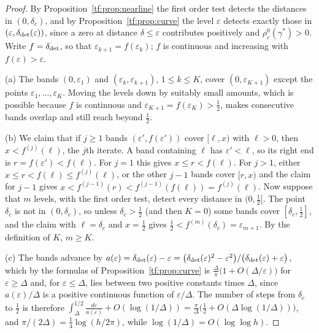\begin{proof}
By Proposition~\ref{tf:prop:nearline} the first order test detects the distances in $(0,\delta_c)$, and by Proposition~\ref{tf:prop:curve} the level $\varepsilon$ detects exactly those in $(\varepsilon,\delta_{\rm det}(\varepsilon))$, since a zero at distance $\delta\le\varepsilon$ contributes positively and $\rho^0_\varepsilon(\gamma^*)>0$. Write $f=\delta_{\rm det}$, so that $\varepsilon_{k+1}=f(\varepsilon_k)$; $f$ is continuous and increasing with $f(\varepsilon)>\varepsilon$.

(a) The bands $(0,\varepsilon_1)$ and $(\varepsilon_k,\varepsilon_{k+1})$, $1\le k\le K$, cover $(0,\varepsilon_{K+1})$ except the points $\varepsilon_1,\dots,\varepsilon_K$. Moving the levels down by suitably small amounts, which is possible because $f$ is continuous and $\varepsilon_{K+1}=f(\varepsilon_K)>\tfrac12$, makes consecutive bands overlap and still reach beyond $\tfrac12$.

(b) We claim that if $j\ge1$ bands $(\varepsilon',f(\varepsilon'))$ cover $[\ell,x)$ with $\ell>0$, then $x<f^{(j)}(\ell)$, the $j$th iterate. A band containing $\ell$ has $\varepsilon'<\ell$, so its right end is $r=f(\varepsilon')<f(\ell)$. For $j=1$ this gives $x\le r<f(\ell)$. For $j>1$, either $x\le r<f(\ell)\le f^{(j)}(\ell)$, or the other $j-1$ bands cover $[r,x)$ and the claim for $j-1$ gives $x<f^{(j-1)}(r)<f^{(j-1)}(f(\ell))=f^{(j)}(\ell)$. Now suppose that $m$ levels, with the first order test, detect every distance in $(0,\tfrac12]$. The point $\delta_c$ is not in $(0,\delta_c)$, so unless $\delta_c>\tfrac12$ (and then $K=0$) some bands cover $[\delta_c,\tfrac12]$, and the claim with $\ell=\delta_c$ and $x=\tfrac12$ gives $\tfrac12<f^{(m)}(\delta_c)=\varepsilon_{m+1}$. By the definition of $K$, $m\ge K$.

(c) The bands advance by $a(\varepsilon)=\delta_{\rm det}(\varepsilon)-\varepsilon=\big(\delta_{\rm det}(\varepsilon)^2-\varepsilon^2\big)/\big(\delta_{\rm det}(\varepsilon)+\varepsilon\big)$, which by the formulas of Proposition~\ref{tf:prop:curve} is $\frac\Delta\pi\big(1+O(\Delta/\varepsilon)\big)$ for $\varepsilon\ge\Delta$ and, for $\varepsilon\le\Delta$, lies between two positive constants times $\Delta$, since $a(\varepsilon)/\Delta$ is a positive continuous function of $\varepsilon/\Delta$. The number of steps from $\delta_c$ to $\tfrac12$ is therefore $\int_{\Delta}^{1/2}\frac{d\varepsilon}{a(\varepsilon)}+O(\log(1/\Delta))=\frac\pi\Delta\big(\tfrac12+O(\Delta\log(1/\Delta))\big)$, and $\pi/(2\Delta)=\tfrac14\log(h/2\pi)$, while $\log(1/\Delta)=O(\log\log h)$.
\end{proof}

